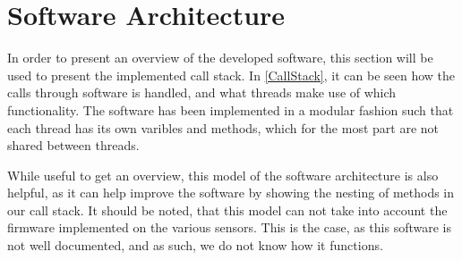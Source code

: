 \section{Software Architecture}
In order to present an overview of the developed software, this section will be
used to present the implemented call stack. In \autoref{CallStack}, it can be
seen how the calls through software is handled, and what threads make use of
which functionality. The software has been implemented in a modular fashion such
that each thread has its own varibles and methods, which for the most part are
not shared between threads.\nl

While useful to get an overview, this model of the software architecture is also
helpful, as it can help improve the software by showing the nesting of methods
in our call stack. It should be noted, that this model can not take into account
the firmware implemented on the various sensors. This is the case, as this
software is not well documented, and as such, we do not know how it functions.





